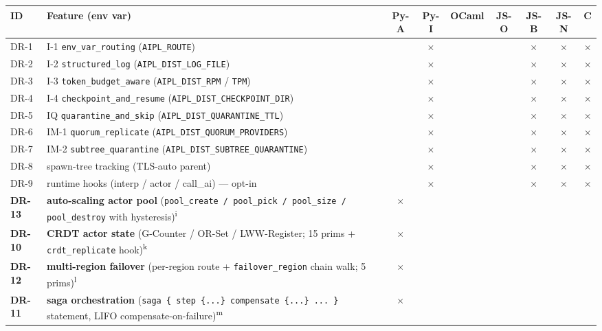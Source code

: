 \documentclass[10pt,a4paper,landscape]{article}
\newcommand{\Yes}{\textcolor{green!50!black}{\textbf{\checkmark}}}
\newcommand{\No}{\textcolor{red!70!black}{$\times$}}
\begin{document}
\begin{longtable}{l F C C C C C C C}
  \toprule
  \textbf{ID} & \textbf{Feature (env var)} & \textbf{Py-A} & \textbf{Py-I} & \textbf{OCaml} & \textbf{JS-O} & \textbf{JS-B} & \textbf{JS-N} & \textbf{C} \\
  \midrule
  \endhead

  DR-1 & I-1 \texttt{env\_var\_routing} (\texttt{AIPL\_ROUTE})       & \Yes & \No & \Yes & \Yes & \No & \No & \No \\
  DR-2 & I-2 \texttt{structured\_log} (\texttt{AIPL\_DIST\_LOG\_FILE}) & \Yes & \No & \Yes & \Yes & \No & \No & \No \\
  DR-3 & I-3 \texttt{token\_budget\_aware} (\texttt{AIPL\_DIST\_RPM} / \texttt{TPM}) & \Yes & \No & \Yes & \Yes & \No & \No & \No \\
  DR-4 & I-4 \texttt{checkpoint\_and\_resume} (\texttt{AIPL\_DIST\_CHECKPOINT\_DIR}) & \Yes & \No & \Yes & \Yes & \No & \No & \No \\
  DR-5 & IQ \texttt{quarantine\_and\_skip} (\texttt{AIPL\_DIST\_QUARANTINE\_TTL}) & \Yes & \No & \Yes & \Yes & \No & \No & \No \\
  DR-6 & IM-1 \texttt{quorum\_replicate} (\texttt{AIPL\_DIST\_QUORUM\_PROVIDERS}) & \Yes & \No & \Yes & \Yes & \No & \No & \No \\
  DR-7 & IM-2 \texttt{subtree\_quarantine} (\texttt{AIPL\_DIST\_SUBTREE\_QUARANTINE}) & \Yes & \No & \Yes & \Yes & \No & \No & \No \\
  DR-8 & spawn-tree tracking (TLS-auto parent)                    & \Yes & \No & \Yes & \Yes & \No & \No & \No \\
  DR-9 & runtime hooks (interp / actor / call\_ai) — opt-in       & \Yes & \No & \Yes & \Yes & \No & \No & \No \\
  \textbf{DR-13} & \textbf{auto-scaling actor pool} (\texttt{pool\_create / pool\_pick / pool\_size / pool\_destroy} with hysteresis)\textsuperscript{i} & \No & \textbf{\Yes} & \textbf{\Yes} & \textbf{\Yes} & \Yes & \Yes & \Yes \\
  \textbf{DR-10} & \textbf{CRDT actor state} (G-Counter / OR-Set / LWW-Register; 15 prims + \texttt{crdt\_replicate} hook)\textsuperscript{k} & \No & \textbf{\Yes} & \textbf{\Yes} & \textbf{\Yes} & \Yes & \Yes & \Yes \\
  \textbf{DR-12} & \textbf{multi-region failover} (per-region route + \texttt{failover\_region} chain walk; 5 prims)\textsuperscript{l} & \No & \textbf{\Yes} & \textbf{\Yes} & \textbf{\Yes} & \Yes & \Yes & \Yes \\
  \textbf{DR-11} & \textbf{saga orchestration} (\texttt{saga \{ step \{...\} compensate \{...\} ... \}} statement, LIFO compensate-on-failure)\textsuperscript{m} & \No & \textbf{\Yes} & \textbf{\Yes} & \textbf{\Yes} & \textbf{\Yes} & \textbf{\Yes} & \Yes \\
  \bottomrule
\end{longtable}
\end{document}
